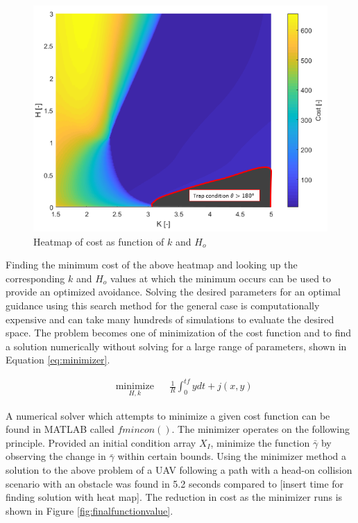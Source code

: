 \documentclass[numbered,pdftex]{ohio-etd}
\begin{document}
\begin{figure}[H]
	\centering
	\includegraphics[trim=0 0 0 10,clip,width=16cm]{PaperFigures/Methods/costHandRwithTrap.png}
	\caption{Heatmap of cost as function of $k$ and $H_o$}
	\label{fig:costHandR}
\end{figure}

Finding the minimum cost of the above heatmap and looking up the corresponding $k$ and $H_o$ values at which the minimum occurs can be used to provide an optimized avoidance. Solving the desired parameters for an optimal guidance using this search method for the general case is computationally expensive and can take many hundreds of simulations to evaluate the desired space. The problem becomes one of minimization of the cost function and to find a solution numerically without solving for a large range of parameters, shown in Equation \ref{eq:minimizer}.

\begin{equation}
\label{eq:minimizer}
\begin{aligned}
& \underset{H,k}{\text{minimize}}
& & \frac{1}{R}\int_{0}^{tf}ydt + j(x,y) 
\end{aligned}
\end{equation}

A numerical solver which attempts to minimize a given cost function can be found in MATLAB called $fmincon()$. The minimizer operates on the following principle. Provided an initial condition array $X_I$, minimize the function $\bar{\gamma}$ by observing the change in $\bar{\gamma}$ within certain bounds. Using the minimizer method a solution to the above problem of a UAV following a path with a head-on collision scenario with an obstacle was found in 5.2 seconds compared to [insert time for finding solution with heat map]. The reduction in cost as the minimizer runs is shown in Figure \ref{fig:finalfunctionvalue}.
\end{document}

